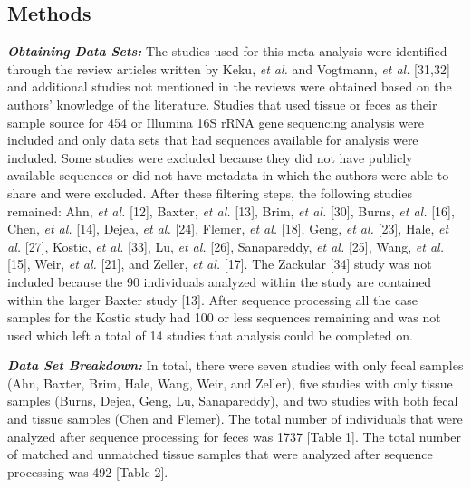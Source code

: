 \documentclass[12pt,]{article}
\begin{document}
\newpage

\subsection{Methods}\label{methods}

\textbf{\emph{Obtaining Data Sets:}} The studies used for this
meta-analysis were identified through the review articles written by
Keku, \emph{et al.} and Vogtmann, \emph{et al.} {[}31,32{]} and
additional studies not mentioned in the reviews were obtained based on
the authors' knowledge of the literature. Studies that used tissue or
feces as their sample source for 454 or Illumina 16S rRNA gene
sequencing analysis were included and only data sets that had sequences
available for analysis were included. Some studies were excluded because
they did not have publicly available sequences or did not have metadata
in which the authors were able to share and were excluded. After these
filtering steps, the following studies remained: Ahn, \emph{et al.}
{[}12{]}, Baxter, \emph{et al.} {[}13{]}, Brim, \emph{et al.} {[}30{]},
Burns, \emph{et al.} {[}16{]}, Chen, \emph{et al.} {[}14{]}, Dejea,
\emph{et al.} {[}24{]}, Flemer, \emph{et al.} {[}18{]}, Geng, \emph{et
al.} {[}23{]}, Hale, \emph{et al.} {[}27{]}, Kostic, \emph{et al.}
{[}33{]}, Lu, \emph{et al.} {[}26{]}, Sanapareddy, \emph{et al.}
{[}25{]}, Wang, \emph{et al.} {[}15{]}, Weir, \emph{et al.} {[}21{]},
and Zeller, \emph{et al.} {[}17{]}. The Zackular {[}34{]} study was not
included because the 90 individuals analyzed within the study are
contained within the larger Baxter study {[}13{]}. After sequence
processing all the case samples for the Kostic study had 100 or less
sequences remaining and was not used which left a total of 14 studies
that analysis could be completed on.

\textbf{\emph{Data Set Breakdown:}} In total, there were seven studies
with only fecal samples (Ahn, Baxter, Brim, Hale, Wang, Weir, and
Zeller), five studies with only tissue samples (Burns, Dejea, Geng, Lu,
Sanapareddy), and two studies with both fecal and tissue samples (Chen
and Flemer). The total number of individuals that were analyzed after
sequence processing for feces was 1737 {[}Table 1{]}. The total number
of matched and unmatched tissue samples that were analyzed after
sequence processing was 492 {[}Table 2{]}.
\end{document}
